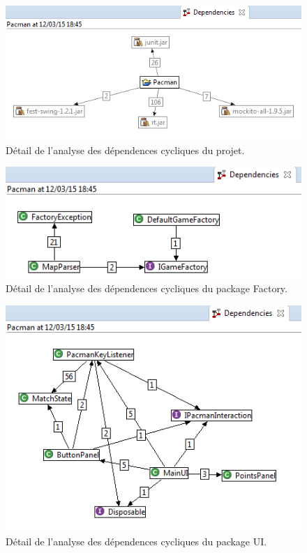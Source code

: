 \documentclass[12pt,a4paper,final]{article}
\begin{document}
\begin{figure}[ht]
	\centering
	\includegraphics[width=\textwidth]{images/DependenciesProject.png}
	\caption{\label{dependenciesP}Détail de l'analyse des dépendences cycliques du projet.}
\end{figure}

\begin{figure}[ht]
	\centering
	\includegraphics[width=\textwidth]{images/DependenciesFactory.png}
	\caption{\label{dependenciesF}Détail de l'analyse des dépendences cycliques du package Factory.}
\end{figure}

\begin{figure}[ht]
	\centering
	\includegraphics[width=\textwidth]{images/DependenciesUI.png}
	\caption{\label{dependenciesUI}Détail de l'analyse des dépendences cycliques du package UI.}
\end{figure}
\end{document}
